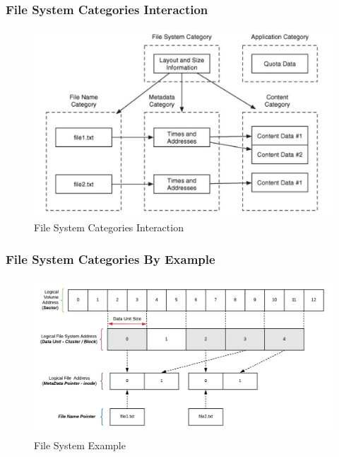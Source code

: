 \documentclass{beamer}
\begin{document}
\begin{frame}
	\frametitle{File System Categories Interaction}
	\begin{figure}[h]
		\includegraphics[scale=0.40]{fs-category-interaction-briancarrier}
		\caption{File System Categories Interaction}
		\label{fig:fs-category-interaction}
	\end{figure}
\end{frame}

\begin{frame}
	\frametitle{File System Categories By Example}
	\begin{figure}[h]
		\includegraphics[scale=0.65]{file-system-example}
		\caption{File System Example}
		\label{fig:fs-example}
	\end{figure}
\end{frame}
\end{document}
